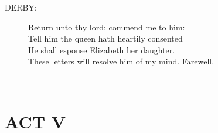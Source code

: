 \documentclass{article}
\begin{document}
\begin{description}
\item[DERBY:] 
\hspace{1pt}Return unto thy lord; commend me to him:\\
\hspace{1pt}Tell him the queen hath heartily consented\\
\hspace{1pt}He shall espouse Elizabeth her daughter.\\
\hspace{1pt}These letters will resolve him of my mind. Farewell.\\
\end{description}
\centering{\it [Exeunt]}\\
\section*{ACT V}
\end{document}
